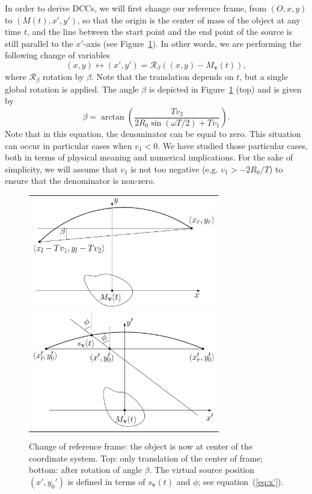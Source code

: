 \documentclass[letterpaper,twocolumn]{IEEEtran}
\newcommand{\Mbv}{M_{\mathbf{v}}}
\newcommand{\sbv}{s_{\mathbf{v}}}
\begin{document}
In order to derive DCCs, we will first change our reference frame, from $\left(O, x, y\right)$ to $\left(M(t), x', y'\right)$, so that the origin is the center of mass of the object at any time $t$, and the line between the start point and the end point of the source is still parallel to the $x'$-axis (see Figure~\ref{fig:change_frame}). In other words, we are performing the following change of variables
\begin{equation}
	(x,y) \leftrightarrow (x',y') = \mathcal{R}_{\beta} \left( (x,y)-\Mbv(t) \right),
\end{equation}
where $\mathcal{R}_{\beta}$ rotation by $\beta$. Note that the translation depends on $t$, but a single global rotation is applied. The angle $\beta$ is depicted in Figure~\ref{fig:change_frame} (top) and is given by
\begin{equation}
	\beta = \arctan \left( \frac{T v_2}{2R_0 \sin(\omega T/2) + T v_1} \right).
\end{equation}
Note that in this equation, the denominator can be equal to zero. This situation can occur in particular cases when $v_1 < 0$. We have studied those particular cases, both in terms of physical meaning and numerical implications. For the sake of simplicity, we will assume that $v_1$ is not too negative (e.g. $v_1 > - 2 R_0 / T$) to ensure that the denominator is non-zero.

\begin{figure}[!ht]
	\centering
	\begin{tabular}{c}
	\includegraphics[width=80mm]{figs/frame_object_before_rotation.eps} \\
	\includegraphics[width=80mm]{figs/frame_object.eps}
	\end{tabular}
	\caption{Change of reference frame: the object is now at center of the coordinate system. Top: only translation of the center of frame; bottom: after rotation of angle $\beta$. The virtual source position $(x',y_0')$ is defined in terms of $\sbv(t)$ and $\phi$; see equation~(\ref{eq:x'}).\label{fig:change_frame}}
\end{figure}
\end{document}
